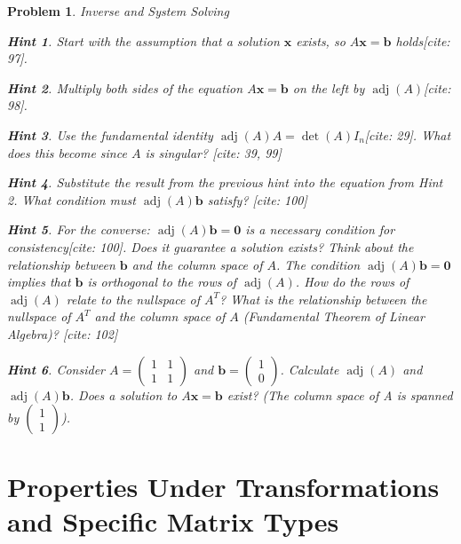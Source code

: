 \documentclass[12pt]{article}
\newtheorem{problem}{Problem}[section]
\theoremstyle{definition}
\newtheorem{hint}{Hint}[question]
\newcommand{\adj}{\operatorname{adj}}
\newcommand{\detm}{\operatorname{det}}
\begin{document}
\begin{problem}{Inverse and System Solving}
        \begin{hint}
            Start with the assumption that a solution $\mathbf{x}$ exists, so $A\mathbf{x} = \mathbf{b}$ holds[cite: 97].
        \end{hint}
        \begin{hint}
            Multiply both sides of the equation $A\mathbf{x} = \mathbf{b}$ on the left by $\adj(A)$[cite: 98].
        \end{hint}
        \begin{hint}
            Use the fundamental identity $\adj(A) A = \detm(A) I_n$[cite: 29]. What does this become since $A$ is singular? [cite: 39, 99]
        \end{hint}
        \begin{hint}
            Substitute the result from the previous hint into the equation from Hint 2. What condition must $\adj(A)\mathbf{b}$ satisfy? [cite: 100]
        \end{hint}
        \begin{hint}
            For the converse: $\adj(A)\mathbf{b} = \mathbf{0}$ is a necessary condition for consistency[cite: 100]. Does it guarantee a solution exists? Think about the relationship between $\mathbf{b}$ and the column space of $A$. The condition $\adj(A)\mathbf{b} = \mathbf{0}$ implies that $\mathbf{b}$ is orthogonal to the rows of $\adj(A)$. How do the rows of $\adj(A)$ relate to the nullspace of $A^T$? What is the relationship between the nullspace of $A^T$ and the column space of $A$ (Fundamental Theorem of Linear Algebra)? [cite: 102]
        \end{hint}
         \begin{hint}
             Consider $A = \begin{pmatrix} 1 & 1 \\ 1 & 1 \end{pmatrix}$ and $\mathbf{b} = \begin{pmatrix} 1 \\ 0 \end{pmatrix}$. Calculate $\adj(A)$ and $\adj(A)\mathbf{b}$. Does a solution to $A\mathbf{x} = \mathbf{b}$ exist? (The column space of A is spanned by $\begin{pmatrix} 1 \\ 1 \end{pmatrix}$).
         \end{hint}
    
\end{problem}

\section{Properties Under Transformations and Specific Matrix Types}
\end{document}
